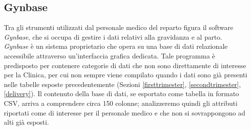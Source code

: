 \subsection{Gynbase}
\label{gynbase}
\newcommand{\Gynbase}{\emph{Gynbase}}

Tra gli strumenti utilizzati dal personale medico del reparto figura il software \Gynbase{}, che si occupa di gestire i dati relativi alla gravidanza e al parto.
\Gynbase{} è un sistema proprietario che opera su una base di dati relazionale accessibile attraverso un'interfaccia grafica dedicata.
Tale programma è predisposto per contenere categorie di dati che non sono direttamente di interesse per la Clinica, per cui non sempre viene compilato quando i dati sono già presenti nelle tabelle esposte precedentemente (Sezioni \ref{firsttrimester}, \ref{secondtrimester}, \ref{delivery}).
Il contenuto della base di dati, se esportato come tabella in formato CSV, arriva a comprendere circa 150 colonne; analizzeremo quindi gli attributi riportati come di interesse per il personale medico e che non si sovrappongono ad alti già esposti.


